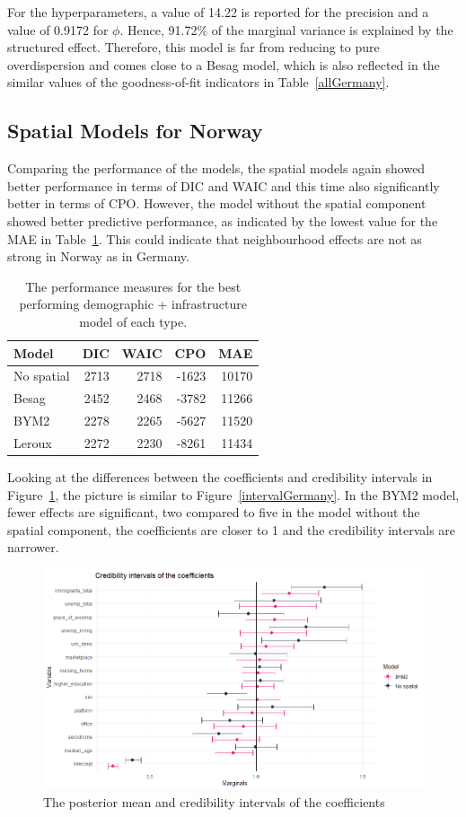 For the hyperparameters, a value of 14.22 is reported for the precision and a value of 0.9172 for $\phi$. Hence, 91.72\% of the marginal variance is explained by the structured effect. Therefore, this model is far from reducing to pure overdispersion and comes close to a Besag model, which is also reflected in the similar values of the goodness-of-fit indicators in Table~\ref{allGermany}.
\subsection{Spatial Models for Norway}
Comparing the performance of the models, the spatial models again showed better performance in terms of DIC and WAIC and this time also significantly better in terms of CPO. However, the model without the spatial component showed better predictive performance, as indicated by the lowest value for the MAE in Table~\ref{allNorway}. This could indicate that neighbourhood effects are not as strong in Norway as in Germany.
\begin{table}[H] 
\caption{The performance measures for the best performing demographic + infrastructure model of each type. \label{allNorway}}
\begin{tabular}{l r r r r}
\toprule
\textbf{Model}	& \textbf{DIC}	& \textbf{WAIC} & \textbf{CPO} & \textbf{MAE} \\
\midrule
No spatial & 2713 & 2718 & -1623 & 10170 \\
Besag  & 2452 & 2468 & -3782 & 11266 \\
BYM2 & 2278 & 2265 & -5627 & 11520\\
Leroux &  2272 & 2230 & -8261 & 11434\\
\bottomrule
\end{tabular}
\end{table}
Looking at the differences between the coefficients and credibility intervals in Figure~\ref{intervalNorway}, the picture is similar to Figure~\ref{intervalGermany}. In the BYM2 model, fewer effects are significant, two compared to five in the model without the spatial component, the coefficients are closer to 1 and the credibility intervals are narrower.
\begin{figure}[H]
    \centering
    \includegraphics[width = \textwidth]{intervals_norway.png}
    \caption{The posterior mean and credibility intervals of the coefficients}
    \label{intervalNorway}
\end{figure}

